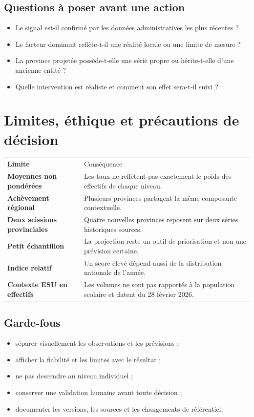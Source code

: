 \documentclass[12pt,a4paper]{article}
\begin{document}
\subsection{Questions à poser avant une action}
\begin{itemize}
  \item Le signal est-il confirmé par les données administratives les plus récentes ?
  \item Le facteur dominant reflète-t-il une réalité locale ou une limite de mesure ?
  \item La province projetée possède-t-elle une série propre ou hérite-t-elle d'une ancienne entité ?
  \item Quelle intervention est réaliste et comment son effet sera-t-il suivi ?
\end{itemize}

\clearpage
\thispagestyle{fancy}

\vspace*{1cm}
\section{Limites, éthique et précautions de décision}
\begin{tabularx}{\textwidth}{>{\bfseries}p{4.4cm} X}
\rowcolor{Navy}\color{white}Limite & \color{white}Conséquence\\
Moyennes non pondérées & Les taux ne reflètent pas exactement le poids des effectifs de chaque niveau.\\
Achèvement régional & Plusieurs provinces partagent la même composante contextuelle.\\
Deux scissions provinciales & Quatre nouvelles provinces reposent sur deux séries historiques sources.\\
Petit échantillon & La projection reste un outil de priorisation et non une prévision certaine.\\
Indice relatif & Un score élevé dépend aussi de la distribution nationale de l'année.\\
Contexte ESU en effectifs & Les volumes ne sont pas rapportés à la population scolaire et datent du 28 février 2026.\\
\end{tabularx}

\subsection{Garde-fous}
\begin{itemize}
  \item séparer visuellement les observations et les prévisions ;
  \item afficher la fiabilité et les limites avec le résultat ;
  \item ne pas descendre au niveau individuel ;
  \item conserver une validation humaine avant toute décision ;
  \item documenter les versions, les sources et les changements de référentiel.
\end{itemize}
\end{document}
